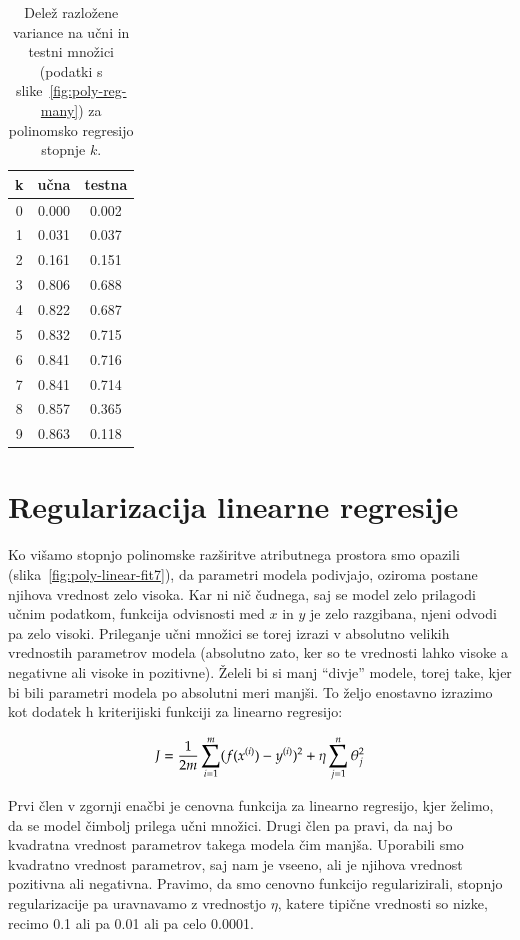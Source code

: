 \begin{table}
  \caption{Delež razložene variance na učni in testni množici (podatki s slike~\ref{fig:poly-reg-many}) za polinomsko regresijo stopnje $k$.}
  \begin{center}
  \begin{tabular}{ccc}
    \hline
    k & učna & testna \\
    \hline
    0 & 0.000 & 0.002 \\
    1 & 0.031 & 0.037 \\
    2 & 0.161 & 0.151 \\
    3 & 0.806 & 0.688 \\
    4 & 0.822 & 0.687 \\
    5 & 0.832 & 0.715 \\
    6 & 0.841 & 0.716 \\
    7 & 0.841 & 0.714 \\
    8 & 0.857 & 0.365 \\
    9 & 0.863 & 0.118 \\
    \hline
  \end{tabular}
  \end{center}
  \label{tab:poly-reg-many-res}
\end{table}

\section{Regularizacija linearne regresije}

Ko višamo stopnjo polinomske razširitve atributnega prostora smo opazili (slika~\ref{fig:poly-linear-fit7}), da parametri modela podivjajo, oziroma postane njihova vrednost zelo visoka. Kar ni nič čudnega, saj se model zelo prilagodi učnim podatkom, funkcija odvisnosti med $x$ in $y$ je zelo razgibana, njeni odvodi pa zelo visoki. Prileganje učni množici se torej izrazi v absolutno velikih vrednostih parametrov modela (absolutno zato, ker so te vrednosti lahko visoke a negativne ali visoke in pozitivne). Želeli bi si manj ``divje'' modele, torej take, kjer bi bili parametri modela po absolutni meri manjši. To željo enostavno izrazimo kot dodatek h kriterijiski funkciji za linearno regresijo:

\begin{equation}
J = {1\over 2m}\sum_{i=1}^m (f(x^{(i)})-y^{(i)})^2 + \eta\sum_{j=1}^n \theta_j^2
\end{equation}

Prvi člen v zgornji enačbi je cenovna funkcija za linearno regresijo, kjer želimo, da se model čimbolj prilega učni množici. Drugi člen pa pravi, da naj bo kvadratna vrednost parametrov takega modela čim manjša. Uporabili smo kvadratno vrednost parametrov, saj nam je vseeno, ali je njihova vrednost pozitivna ali negativna. Pravimo, da smo cenovno funkcijo regularizirali, stopnjo regularizacije pa uravnavamo z vrednostjo $\eta$, katere tipične vrednosti so nizke, recimo 0.1 ali pa 0.01 ali pa celo 0.0001.

